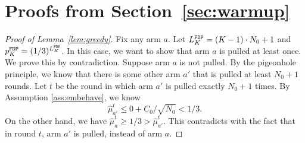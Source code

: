 \section{Proofs from Section~\ref{sec:warmup}}
\label{app:warmup}

\begin{proof}[Proof of Lemma~\ref{lem:greedy}]
  Fix any arm $a$. Let $L^\mathtt{FDP}_K = (K-1) \cdot N_0 + 1$ and
  $p^\mathtt{FDP}_K = (1/3)^{L^\mathtt{FDP}_K}$. 
  In this case, we want to show that arm $a$ is pulled at least
  once. We prove this by contradiction. Suppose arm $a$ is not pulled. By
  the pigeonhole principle, we know that there is some other arm $a'$
  that is pulled at least $N_0 + 1$ rounds. Let $t$ be the round in
  which arm $a'$ is pulled exactly $N_0 + 1$ times. By Assumption
  \ref{ass:embehave}, we know
  \[
    \hat{\mu}_{a'}^t \leq 0 + C_0 / \sqrt{N_0} < 1/3.
  \]
   On the other hand, we have
  $\hat{\mu}_a^t \geq 1/3 > \hat{\mu}_{a'}^t$. This contradicts with
  the fact that in round $t$, arm $a'$ is pulled, instead of arm $a$.
\end{proof}


